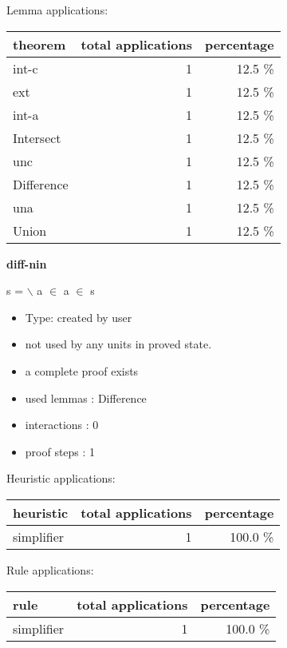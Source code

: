 \documentclass[a4paper]{article}
\begin{document}
Lemma applications:

\begin{supertabular}{l|r|r}
theorem	        & total applications & percentage \\ \hline
int-c & 1 & 12.5 \% \\
ext & 1 & 12.5 \% \\
int-a & 1 & 12.5 \% \\
Intersect & 1 & 12.5 \% \\
unc & 1 & 12.5 \% \\
Difference & 1 & 12.5 \% \\
una & 1 & 12.5 \% \\
Union & 1 & 12.5 \% \\

\end{supertabular}
\pagebreak

{\LARGE\bf diff-nin}\label{lemma-diff-nin}

\medskip

 \Fol s =  $\backslash$  \And a $\in$  \Imp \Not a $\in$ s

\begin{itemize}

\item Type: created by user

\item not used by any units in proved state.
\item       a complete proof exists
\item       used lemmas  : Difference
\item       interactions : 0
\item       proof steps  : 1
\end{itemize}

\medskip


Heuristic applications:

\begin{supertabular}{l|r|r}
heuristic	& total applications & percentage \\ \hline
simplifier & 1 & 100.0 \% \\

\end{supertabular}

Rule applications:

\begin{supertabular}{l|r|r}
rule	        & total applications & percentage \\ \hline
simplifier & 1 & 100.0 \% \\

\end{supertabular}
\end{document}
